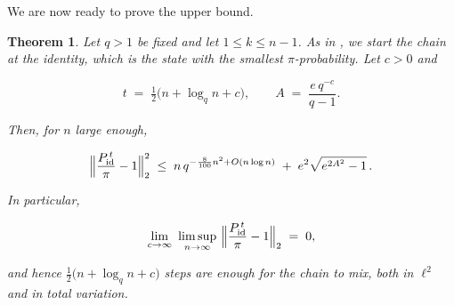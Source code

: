 \documentclass[11pt]{article}
\theoremstyle{plain}  %
\newtheorem{theorem}{Theorem}[section]
\begin{document}
We are now ready to prove the upper bound.

\begin{theorem}\label{thm:upper}
Let $q>1$ be fixed and let $1 \le k \le n-1$. As in \cite{DiaconisRam2000}, we
start the chain at the identity, which is the state with the smallest
$\pi$-probability. Let $c>0$ and

$$
  t \;=\; \tfrac12\bigl(n + \log_q n + c\bigr),
  \qquad
  A \;=\; \frac{e\,q^{-c}}{q-1} .
$$

Then, for $n$ large enough,

$$
  \Bigl\|\frac{P^{\,t}_{\mathrm{id}}}{\pi}-1\Bigr\|_2^{2}
  \;\le\;
  n\,q^{-\frac{8}{100}n^{2} + O(n\log n)}
  \;+\;
  e^{2}\sqrt{e^{2A^{2}}-1}\,.
$$

In particular,

$$
  \lim_{c\to\infty}\ \limsup_{n\to\infty}\
  \Bigl\|\frac{P^{\,t}_{\mathrm{id}}}{\pi}-1\Bigr\|_2 \;=\; 0,
$$

and hence $\frac12\bigl(n+\log_q n+c\bigr)$ steps are enough for the chain to
mix, both in $\ell^2$ and in total variation.
\end{theorem}
\end{document}
